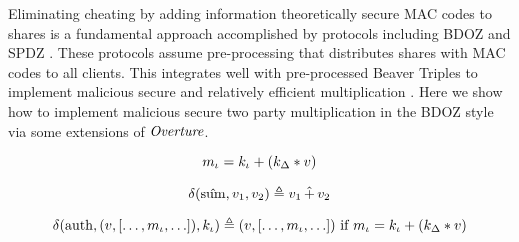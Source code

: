 Eliminating cheating by adding information theoretically secure MAC
codes to shares is a fundamental approach accomplished by protocols
including BDOZ \cite{XXX} and SPDZ \cite{XXX}.  These protocols assume
pre-processing that distributes shares with MAC codes to all clients.
This integrates well with pre-processed Beaver Triples to implement
malicious secure and relatively efficient multiplication \cite{XXX}.
Here we show how to implement malicious secure two party multiplication
in the BDOZ style via some extensions of $\mathit{Overture}$.


$$
m_\iota = k_\iota + (k_\Delta * v)
$$

$$
\delta(\hat{\mathrm{sum}},v_1,v_2) \triangleq v_1 \,\hat{+}\, v_2
$$

$$
\delta(\mathrm{auth}, (v, [\ldots,m_\iota,\ldots]), k_\iota) \triangleq
     (v, [\ldots,m_\iota,\ldots]) \text{\ if\ } m_\iota = k_\iota + (k_\Delta * v)
$$

